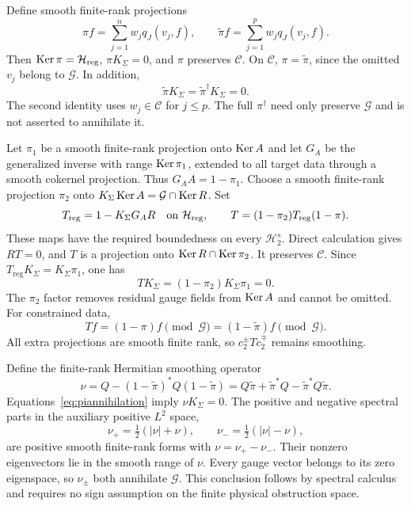 Define smooth finite-rank projections
\[
\pi f=\sum_{j=1}^n w_jq_J(v_j,f),\qquad
\widetilde\pi f=\sum_{j=1}^p w_jq_J(v_j,f).
\]
Then $\operatorname{Ker}\pi=\mathcal H_{\mathrm{reg}}$, $\pi K_\Sigma=0$, and $\pi$ preserves $\mathcal C$.
On $\mathcal C$, $\pi=\widetilde\pi$, since the omitted $v_j$ belong to $\mathcal G$.
In addition,
\begin{equation}\label{eq:piannihilation}
\widetilde\pi K_\Sigma=\widetilde\pi^\dagger K_\Sigma=0.
\end{equation}
The second identity uses $w_j\in\mathcal C$ for $j\le p$.
The full $\pi^\dagger$ need only preserve $\mathcal G$ and is not asserted to annihilate it.

Let $\pi_1$ be a smooth finite-rank projection onto $\operatorname{Ker} A$ and let $G_A$ be the generalized inverse with range $\operatorname{Ker}\pi_1$, extended to all target data through a smooth cokernel projection.
Thus $G_AA=1-\pi_1$.
Choose a smooth finite-rank projection $\pi_2$ onto $K_\Sigma\operatorname{Ker} A=\mathcal G\cap\operatorname{Ker} R$.
Set
\begin{equation}\label{eq:Tsingular}
T_{\mathrm{reg}}=1-K_\Sigma G_AR\quad\hbox{on }\mathcal H_{\mathrm{reg}},
\qquad T=(1-\pi_2)T_{\mathrm{reg}}(1-\pi).
\end{equation}
These maps have the required boundedness on every $\mathcal H_2^s$.
Direct calculation gives $RT=0$, and $T$ is a projection onto $\operatorname{Ker} R\cap\operatorname{Ker}\pi_2$.
It preserves $\mathcal C$.
Since $T_{\mathrm{reg}}K_\Sigma=K_\Sigma\pi_1$, one has
\[
TK_\Sigma=(1-\pi_2)K_\Sigma\pi_1=0.
\]
The $\pi_2$ factor removes residual gauge fields from $\operatorname{Ker} A$ and cannot be omitted.
For constrained data,
\begin{equation}\label{eq:Tquotient}
Tf=(1-\pi)f\pmod{\mathcal G}
=(1-\widetilde\pi)f\pmod{\mathcal G}.
\end{equation}
All extra projections are smooth finite rank, so $c_2^\pm Tc_2^\mp$ remains smoothing.

Define the finite-rank Hermitian smoothing operator
\begin{equation}\label{eq:nu}
\nu=Q-(1-\widetilde\pi)^*Q(1-\widetilde\pi)
=Q\widetilde\pi+\widetilde\pi^*Q-\widetilde\pi^*Q\widetilde\pi.
\end{equation}
Equations~\eqref{eq:piannihilation} imply $\nu K_\Sigma=0$.
The positive and negative spectral parts in the auxiliary positive $L^2$ space,
\[
\nu_+=\tfrac12(|\nu|+\nu),\qquad
\nu_-=\tfrac12(|\nu|-\nu),
\]
are positive smooth finite-rank forms with $\nu=\nu_+-\nu_-$.
Their nonzero eigenvectors lie in the smooth range of $\nu$.
Every gauge vector belongs to its zero eigenspace, so $\nu_\pm$ both annihilate $\mathcal G$.
This conclusion follows by spectral calculus and requires no sign assumption on the finite physical obstruction space.

